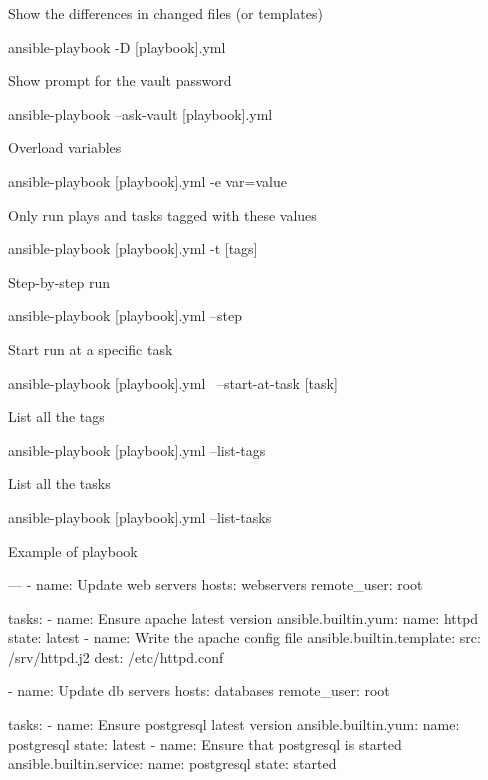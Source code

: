 \documentclass{refcard}
\begin{document}
Show the differences in changed files (or templates)
\begin{ttyenv}
ansible-playbook -D [playbook].yml 
\end{ttyenv}

Show prompt for the vault password
\begin{ttyenv}
ansible-playbook --ask-vault [playbook].yml 
\end{ttyenv}

Overload variables
\begin{ttyenv}
ansible-playbook [playbook].yml -e var=value
\end{ttyenv}

Only run plays and tasks tagged with these values
\begin{ttyenv}
ansible-playbook [playbook].yml -t [tags]
\end{ttyenv}

Step-by-step run
\begin{ttyenv}
ansible-playbook [playbook].yml --step
\end{ttyenv}

Start run at a specific task
\begin{ttyenv}
ansible-playbook [playbook].yml \
 --start-at-task [task]
\end{ttyenv}

List all the tags
\begin{ttyenv}
ansible-playbook [playbook].yml --list-tags
\end{ttyenv}

List all the tasks
\begin{ttyenv}
ansible-playbook [playbook].yml --list-tasks
\end{ttyenv}

Example of playbook
\begin{yamlbox}
---
- name: Update web servers
  hosts: webservers
  remote_user: root

  tasks:
  - name: Ensure apache latest version
    ansible.builtin.yum:
      name: httpd
      state: latest
  - name: Write the apache config file
    ansible.builtin.template:
      src: /srv/httpd.j2
      dest: /etc/httpd.conf

- name: Update db servers
  hosts: databases
  remote_user: root

  tasks:
  - name: Ensure postgresql latest version
    ansible.builtin.yum:
      name: postgresql
      state: latest
  - name: Ensure that postgresql is started
    ansible.builtin.service:
      name: postgresql
      state: started
\end{yamlbox}
\end{document}
